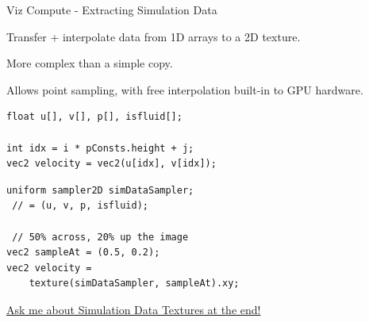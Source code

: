 \begin{frame}[fragile]{Viz Compute - Extracting Simulation Data}

    \begin{minipage}{0.48\textwidth}
       \begin{wideitemize}
            \item Transfer + interpolate data from 1D arrays to a 2D texture.
            \item More complex than a simple copy. %
            \item Allows point sampling, with free interpolation built-in to GPU hardware.
        \end{wideitemize}
    \end{minipage}\hfill%
    \begin{minipage}{0.5\textwidth}
    \lstset{language=glsl}
        \begin{lstlisting}
float u[], v[], p[], isfluid[];

int idx = i * pConsts.height + j;
vec2 velocity = vec2(u[idx], v[idx]);\end{lstlisting}

        
        \begin{lstlisting}
uniform sampler2D simDataSampler;
 // = (u, v, p, isfluid);
 
 // 50% across, 20% up the image
vec2 sampleAt = (0.5, 0.2);
vec2 velocity = 
    texture(simDataSampler, sampleAt).xy;\end{lstlisting}

    \end{minipage}
    

    \vfill\null
    \begin{center}
        \hyperlink{frame:simdatatex}{Ask me about Simulation Data Textures at the end!}
    \end{center}
\end{frame}

